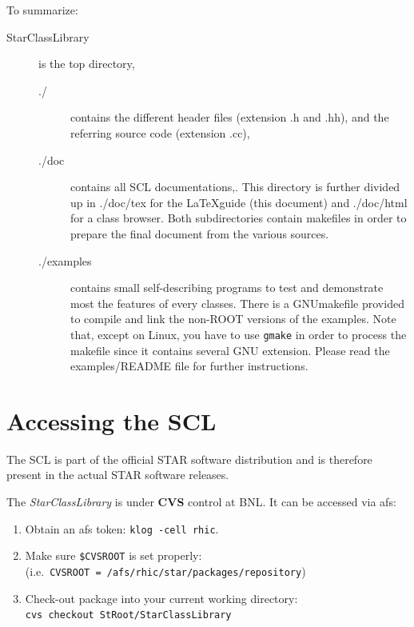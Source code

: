 \documentclass[twoside]{article}
\newcommand{\name}[1]{\textsf{#1}}%
\newcommand{\comp}[1]{\texttt{#1}}%
\begin{document}
To summarize:
\vspace{-11pt}
\begin{description}
\item[\name{StarClassLibrary}] is the top directory,
\begin{description}
\item[\name{./}] contains the different header files
    (extension \name{.h} and \name{.hh}),
and the referring source code (extension \name{.cc}),
\item[\name{./doc}] contains all SCL documentations,. This directory is
    further divided up in \name{./doc/tex} for the \LaTeX guide (this document)
    and \name{./doc/html} for a class browser. Both subdirectories
    contain makefiles in order to prepare the final document from the
    various sources.
\item[\name{./examples}] contains small self-describing programs to test and
    demonstrate most the features of every classes. There is a
    \name{GNUmakefile}
    provided to compile and link the non-ROOT versions of the examples.
    Note that, except on Linux, you have to use \comp{gmake} in order to
    process the makefile since it contains several GNU extension. Please
    read the \name{examples/README} file for further instructions.
\end{description}    
\end{description}

\section{Accessing the SCL}  

The SCL is part of the official STAR software distribution
and is therefore present in the actual STAR software releases.

The {\em StarClassLibrary} is under {\bf CVS} control at BNL.  It can
be accessed via \name{afs}:   
\begin{enumerate}
  \item Obtain an \name{afs} token: \comp{klog -cell rhic}.
  \item Make sure \comp{\$CVSROOT} is set properly:\\
    (i.e.~\comp{CVSROOT = /afs/rhic/star/packages/repository})
  \item Check-out package into your current working directory:\\
    \comp{cvs checkout StRoot/StarClassLibrary}
\end{enumerate}
\end{document}
